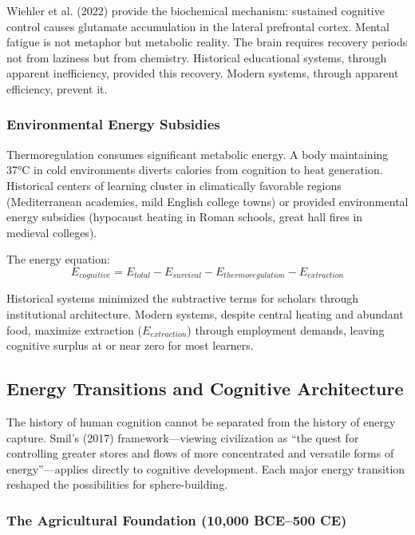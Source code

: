 Wiehler et al. (2022) provide the biochemical mechanism: sustained cognitive control causes glutamate accumulation in the lateral prefrontal cortex. Mental fatigue is not metaphor but metabolic reality. The brain requires recovery periods not from laziness but from chemistry. Historical educational systems, through apparent inefficiency, provided this recovery. Modern systems, through apparent efficiency, prevent it.

\subsubsection{Environmental Energy Subsidies}

Thermoregulation consumes significant metabolic energy. A body maintaining 37°C in cold environments diverts calories from cognition to heat generation. Historical centers of learning cluster in climatically favorable regions (Mediterranean academies, mild English college towns) or provided environmental energy subsidies (hypocaust heating in Roman schools, great hall fires in medieval colleges).

The energy equation:
\begin{equation}
E_{cognitive} = E_{total} - E_{survival} - E_{thermoregulation} - E_{extraction}
\end{equation}

Historical systems minimized the subtractive terms for scholars through institutional architecture. Modern systems, despite central heating and abundant food, maximize extraction ($E_{extraction}$) through employment demands, leaving cognitive surplus at or near zero for most learners.

\subsection{Energy Transitions and Cognitive Architecture}

The history of human cognition cannot be separated from the history of energy capture. Smil's (2017) framework---viewing civilization as ``the quest for controlling greater stores and flows of more concentrated and versatile forms of energy''---applies directly to cognitive development. Each major energy transition reshaped the possibilities for sphere-building.

\subsubsection{The Agricultural Foundation (10,000 BCE--500 CE)}

